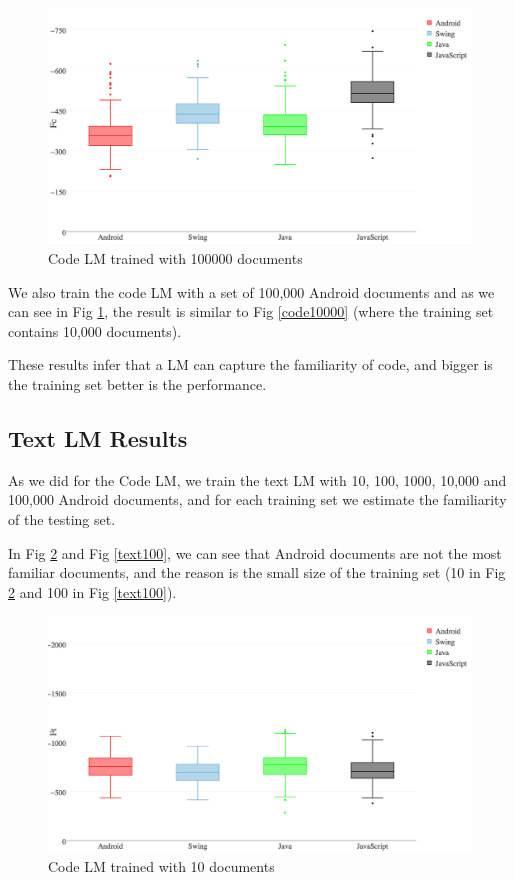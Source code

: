\documentclass[12pt,mscthesis]{usiinfthesis}
\begin{document}
{\begin{figure}[H]
			\centering
			\includegraphics[width=\textwidth]{code100000}
			\caption{Code LM trained with 100000 documents}
			\label{code100000}
\end{figure}	

 We also train the code LM with a set of 100,000 Android documents and as we can see in Fig \ref{code100000}, the result is similar to Fig \ref{code10000} (where the training set contains 10,000 documents).

These results infer that a LM can capture the familiarity of code, and bigger is the training set better is the performance.


\subsection{Text LM Results}

 As we did for the Code LM, we train the text LM with 10, 100, 1000, 10,000 and 100,000 Android documents, and for each training set we estimate the familiarity of the testing set.\newpage
	
In Fig \ref{text10} and Fig \ref{text100}, we can see that Android documents are not the most familiar documents, and the reason is the small size of the training set (10 in Fig \ref{text10} and 100 in Fig \ref{text100}).

\begin{figure}[H]
			\centering
			\includegraphics[width=\textwidth]{text10}
			\caption{Code LM trained with 10 documents}
			\label{text10}
\end{figure}

}
\end{document}

